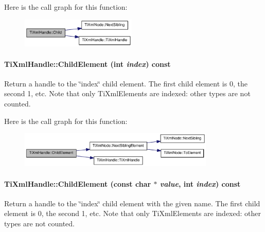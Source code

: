 Here is the call graph for this function:\nopagebreak
\begin{figure}[H]
\begin{center}
\leavevmode
\includegraphics[width=156pt]{class_ti_xml_handle_a072492b4be1acdb0db2d03cd8f71ccc4_cgraph}
\end{center}
\end{figure}
\hypertarget{class_ti_xml_handle_a8786475b9d1f1518492e3a46704c7ef0}{
\paragraph[{ChildElement}]{ TiXmlHandle::ChildElement (int {\em index}) const}\hfill}
\label{class_ti_xml_handle_a8786475b9d1f1518492e3a46704c7ef0}
Return a handle to the \char`\"{}index\char`\"{} child element. The first child element is 0, the second 1, etc. Note that only TiXmlElements are indexed: other types are not counted. 

Here is the call graph for this function:\nopagebreak
\begin{figure}[H]
\begin{center}
\leavevmode
\includegraphics[width=264pt]{class_ti_xml_handle_a8786475b9d1f1518492e3a46704c7ef0_cgraph}
\end{center}
\end{figure}
\hypertarget{class_ti_xml_handle_a979a3f850984a176ee884e394c7eed2d}{
\paragraph[{ChildElement}]{ TiXmlHandle::ChildElement (const char $\ast$ {\em value}, \/  int {\em index}) const}\hfill}
\label{class_ti_xml_handle_a979a3f850984a176ee884e394c7eed2d}
Return a handle to the \char`\"{}index\char`\"{} child element with the given name. The first child element is 0, the second 1, etc. Note that only TiXmlElements are indexed: other types are not counted. 

